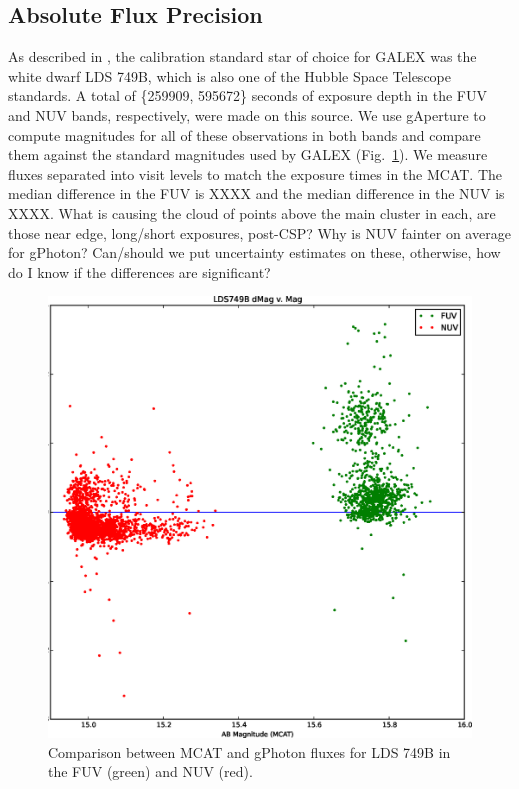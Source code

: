 \documentclass[5p]{elsarticle}
\begin{document}
\subsection{Absolute Flux Precision}
As described in \citet{mor2007}, the calibration standard star of choice for GALEX was the white dwarf LDS 749B, which is also one of the Hubble Space Telescope standards. A total of \{259909, 595672\} seconds of exposure depth in the FUV and NUV bands, respectively, were made on this source. We use gAperture to compute magnitudes for all of these observations in both bands and compare them against the standard magnitudes used by GALEX (Fig.\ \ref{ldsabsphot}).  We measure fluxes separated into visit levels to match the exposure times in the MCAT.  The median difference in the FUV is {\color{red}XXXX} and the median difference in the NUV is {\color{red}XXXX}.  {\color{red}What is causing the cloud of points above the main cluster in each, are those near edge, long/short exposures, post-CSP?  Why is NUV fainter on average for gPhoton?  Can/should we put uncertainty estimates on these, otherwise, how do I know if the differences are significant?}

\begin{figure}
\includegraphics[scale=0.35]{FigAbsPhotLDS.eps}
\caption{Comparison between MCAT and gPhoton fluxes for LDS 749B in the FUV (green) and NUV (red). \label{ldsabsphot}}
\end{figure}
\end{document}
